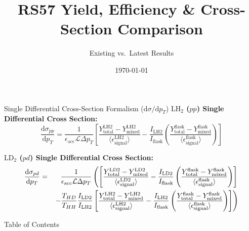 \documentclass[aspectratio=169, 10pt]{beamer}
\title[RS57 XSec Comparison]{RS57 Yield, Efficiency \& Cross-Section Comparison}
\subtitle{Existing vs.\ Latest Results}
\date{\today}
\providecommand{\diffd}{\mathrm{d}}
\begin{document}
\begin{frame}
    \titlepage
\end{frame}

\begin{frame}{Single Differential Cross-Section Formalism ($\diffd\sigma / \diffd p_T$)}
    \textbf{$\text{LH}_2$ ($pp$) Single Differential Cross Section:}
    \begin{equation}
        \frac{\diffd\sigma_{pp}}{\diffd p_{T}} = \frac{1}{\epsilon_{\text{acc}} \mathcal{L} \Delta p_{T}} 
        \left[ 
            \frac{Y^{\text{LH2}}_{\text{total}} - Y^{\text{LH2}}_{\text{mixed}}}{\langle\epsilon^{\text{LH2}}_{\text{signal}}\rangle} 
- \frac{I_{\text{LH2}}}{I_{\text{flask}}} 
            \left( \frac{Y^{\text{flask}}_{\text{total}} - Y^{\text{flask}}_{\text{mixed}}}{\langle\epsilon^{\text{flask}}_{\text{signal}}\rangle} \right)
        \right]
        \label{eq:modified_cross_section_pt}
    \end{equation}

    \vspace{0.3em}
    \textbf{$\text{LD}_2$ ($pd$) Single Differential Cross Section:}
    {\small
    \begin{eqnarray}
        \frac{\diffd\sigma_{pd}}{\diffd p_{T}} &=& \frac{1}{\epsilon_{\text{acc}} \mathcal{L} \Delta p_{T}} 
        \left(
        \left[ 
            \frac{Y^{\text{LD2}}_{\text{total}} - Y^{\text{LD2}}_{\text{mixed}}}{\langle\epsilon^{\text{LD2}}_{\text{signal}}\rangle} 
- \frac{I_{\text{LD2}}}{I_{\text{flask}}} 
            \left( \frac{Y^{\text{flask}}_{\text{total}} - Y^{\text{flask}}_{\text{mixed}}}{\langle\epsilon^{\text{flask}}_{\text{signal}}\rangle} \right)
        \right] \right. \nonumber \\
        & & \left. - \frac{T_{HD}}{T_{HH}} \frac{I_{\rm LD2}}{I_{\rm LH2}}\left[ 
            \frac{Y^{\text{LH2}}_{\text{total}} - Y^{\text{LH2}}_{\text{mixed}}}{\langle\epsilon^{\text{LH2}}_{\text{signal}}\rangle} 
- \frac{I_{\text{LH2}}}{I_{\text{flask}}} 
            \left( \frac{Y^{\text{flask}}_{\text{total}} - Y^{\text{flask}}_{\text{mixed}}}{\langle\epsilon^{\text{flask}}_{\text{signal}}\rangle} \right)
        \right]
        \right)
        \label{eq:modified_cross_section_pd_pt}
    \end{eqnarray}
    }
\end{frame}

\begin{frame}{Table of Contents}
    \tableofcontents
\end{frame}
\end{document}
